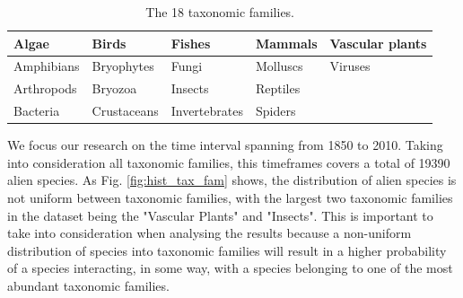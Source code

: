 \documentclass[mscthesis]{usiinfthesis}
\begin{document}
\begin{table}[H]
\centering
\begin{tabular}{|l|l|l|l|l|}
\hline
Algae      & Birds       & Fishes        & Mammals  & Vascular plants \\ \hline
Amphibians & Bryophytes  & Fungi         & Molluscs & Viruses         \\ \hline
Arthropods & Bryozoa     & Insects       & Reptiles &                 \\ \hline
Bacteria   & Crustaceans & Invertebrates & Spiders  &                 \\ \hline             
\end{tabular}
\caption{The 18 taxonomic families.}
\label{table:families}
\end{table}

We focus our research on the time interval spanning from 1850 to 2010. Taking into consideration all taxonomic families, this timeframes covers a total of 19390 alien species. As Fig. \ref{fig:hist_tax_fam} shows, the distribution of alien species is not uniform between taxonomic families, with the largest two taxonomic families in the dataset being the "Vascular Plants" and "Insects". This is important to take into consideration when analysing the results because a non-uniform distribution of species into taxonomic families will result in a higher probability of a species interacting, in some way, with a species belonging to one of the most abundant taxonomic families.
\end{document}
